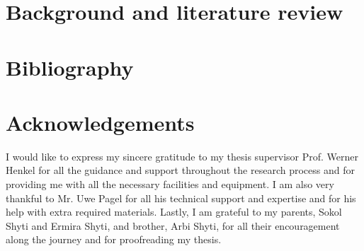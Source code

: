 \documentclass[a4paper,11pt,oneside]{article}
\begin{document}
  \section{Background and literature review}
  






  
  
  


  \newpage
  \section*{Bibliography}

  
  


  \newpage
  \section*{Acknowledgements}
  
  I would like to express my sincere gratitude to my thesis supervisor Prof. Werner Henkel for all the guidance and support throughout the research process and for providing me with all the necessary facilities and equipment. I am also very thankful to Mr. Uwe Pagel for all his technical support and expertise and for his help with extra required materials. Lastly, I am grateful to my parents, Sokol Shyti and Ermira Shyti, and brother, Arbi Shyti, for all their encouragement along the journey and for proofreading my thesis.  
\end{document}
